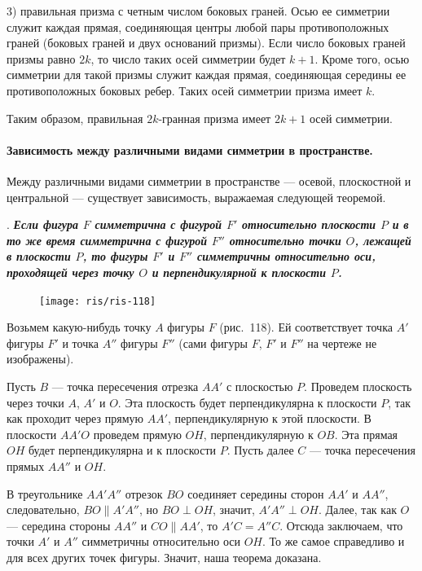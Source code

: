 \documentclass[twoside]{book}
\begin{document}
3) правильная призма с четным числом боковых граней.
Осью ее симметрии служит каждая прямая, соединяющая центры любой пары противоположных граней (боковых граней и двух оснований призмы).
Если число боковых граней призмы равно $2k$, то число таких осей симметрии будет $k+1$.
Кроме того, осью симметрии для такой призмы служит каждая прямая, соединяющая середины ее противоположных боковых ребер.
Таких осей симметрии призма имеет $k$.

Таким образом, правильная $2k$-гранная призма имеет $2k+1$ осей симметрии.

\paragraph{Зависимость между различными видами симметрии в пространстве.}\label{1938/s102}
Между различными видами симметрии в пространстве --- осевой, плоскостной и центральной --- существует зависимость, выражаемая следующей теоремой.

.
\textbf{\emph{Если фигура $F$ симметрична с фигурой $F'$ относительно плоскости $P$ и в то же время симметрична с фигурой $F''$ относительно точки $O$, лежащей в плоскости $P$, то фигуры $F'$ и $F''$ симметричны относительно оси, проходящей через точку $O$ и перпендикулярной к плоскости $P$.}}

\begin{figure}[h!]
\centering
\texttt{[image: ris/ris-118]}
\caption{}
\end{figure}

Возьмем какую-нибудь точку $A$ фигуры $F$ (рис.~118).
Ей соответствует точка $A'$ фигуры $F'$ и точка $A''$ фигуры $F''$ (сами фигуры $F$, $F'$ и $F''$ на чертеже не изображены).

Пусть $B$ --- точка пересечения отрезка $AA'$ с плоскостью $P$.
Проведем плоскость через точки $A$, $A'$ и $O$.
Эта плоскость будет перпендикулярна к плоскости $P$, так как проходит через прямую $AA'$, перпендикулярную к этой плоскости.
В плоскости $AA'O$ проведем прямую $OH$, перпендикулярную к $OB$.
Эта прямая $OH$ будет перпендикулярна и к плоскости $P$.
Пусть далее $C$ --- точка пересечения прямых $AA''$ и $OH$.

В треугольнике $AA'A''$ отрезок $BO$ соединяет середины сторон $AA'$ и $AA''$, следовательно, $BO\parallel A'A''$, но $BO\perp OH$, значит, $A'A''\perp OH$.
Далее, так как $O$ --- середина стороны $AA''$ и $CO\parallel AA'$, то $A'C = A''C$.
Отсюда заключаем, что точки $A'$ и $A''$ симметричны относительно оси $OH$.
То же самое справедливо и для всех других точек фигуры.
Значит, наша теорема доказана.
\end{document}
